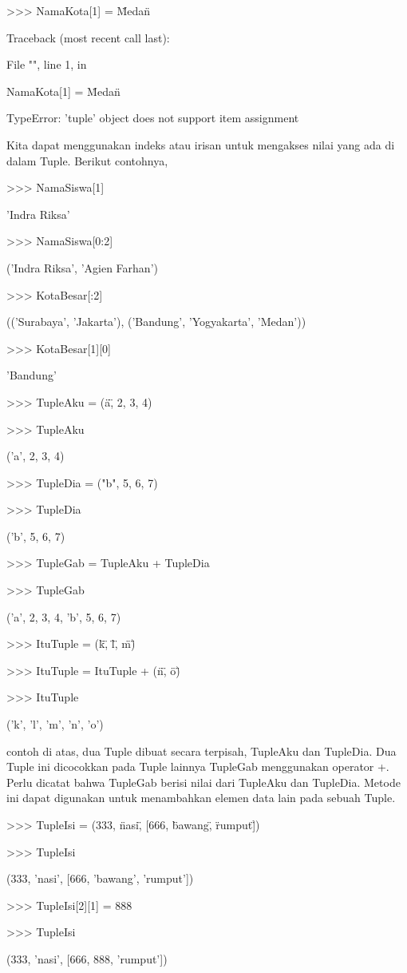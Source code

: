 >>> NamaKota[1] = \"Medan\" \par
Traceback (most recent call last): \par
File "", line 1, in \par
NamaKota[1] = \"Medan\" \par

TypeError: 'tuple' object does not support item assignment \par

Kita dapat menggunakan indeks atau irisan untuk mengakses nilai yang ada di dalam Tuple. Berikut contohnya, \par

>>> NamaSiswa[1] \par
'Indra Riksa' \par
>>> NamaSiswa[0:2] \par
('Indra Riksa', 'Agien Farhan') \par
>>> KotaBesar[:2] \par
(('Surabaya', 'Jakarta'), ('Bandung', 'Yogyakarta', 'Medan')) \par
>>> KotaBesar[1][0] \par
'Bandung' \par

>>> TupleAku = (\"a\", 2, 3, 4) \par
>>> TupleAku \par
('a', 2, 3, 4) \par
>>> TupleDia = ("b", 5, 6, 7) \par
>>> TupleDia \par
('b', 5, 6, 7) \par
>>> TupleGab = TupleAku + TupleDia \par
>>> TupleGab \par
('a', 2, 3, 4, 'b', 5, 6, 7) \par

>>> ItuTuple = (\"k\", \"l\", \"m\") \par
>>> ItuTuple = ItuTuple + (\"n\", \"o\") \par
>>> ItuTuple \par
('k', 'l', 'm', 'n', 'o') \par
contoh di atas, dua Tuple dibuat secara terpisah, TupleAku dan TupleDia. Dua Tuple ini dicocokkan pada Tuple lainnya TupleGab menggunakan operator +. Perlu dicatat bahwa TupleGab berisi nilai dari TupleAku dan TupleDia. Metode ini dapat digunakan untuk menambahkan elemen data lain pada sebuah Tuple. \par

>>> TupleIsi = (333, \"nasi\", [666, \"bawang\", \"rumput\"]) \par
>>> TupleIsi \par
(333, 'nasi', [666, 'bawang', 'rumput']) \par
>>> TupleIsi[2][1] = 888 \par
>>> TupleIsi \par
(333, 'nasi', [666, 888, 'rumput']) \par

